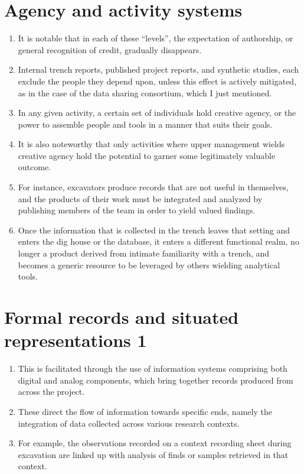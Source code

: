 \documentclass[12pt]{article}
\begin{document}
\section{Agency and activity systems}
\begin{enumerate}
  \item It is notable that in each of these ``levels'', the expectation of authorship, or general recognition of credit, gradually disappears.
  \item Internal trench reports, published project reports, and synthetic studies, each exclude the people they depend upon, unless this effect is actively mitigated, as in the case of the data sharing consortium, which I just mentioned.
  \item In any given activity, a certain set of individuals hold creative agency, or the power to assemble people and tools in a manner that suits their goals.
  \item It is also noteworthy that only activities where upper management wields creative agency hold the potential to garner some legitimately valuable outcome.
  \item For instance, excavators produce records that are not useful in themselves, and the products of their work must be integrated and analyzed by publishing members of the team in order to yield valued findings.
  \item Once the information that is collected in the trench leaves that setting and enters the dig house or the database, it enters a different functional realm, no longer a product derived from intimate familiarity with a trench, and becomes a generic resource to be leveraged by others wielding analytical tools.
\end{enumerate}

\section{Formal records and situated representations 1}
\begin{enumerate}
  \item This is facilitated through the use of information systems comprising both digital and analog components, which bring together records produced from across the project.
  \item These direct the flow of information towards specific ends, namely the integration of data collected across various research contexts.
  \item For example, the observations recorded on a context recording sheet during excavation are linked up with analysis of finds or samples retrieved in that context.
\end{enumerate}
  
\end{document}
